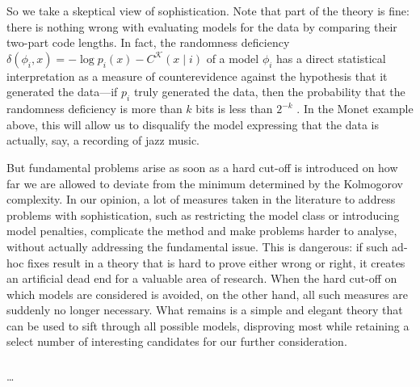 \documentclass{style/llncs}
\newcommand{\K}{\mathscr K}
\newcommand{\hide}[1]{}
\begin{document}
So we take a skeptical view of sophistication. Note that part of the theory is fine: there is nothing wrong with evaluating models for the data by comparing their two-part code lengths. In fact, the randomness deficiency $\delta(\phi_i,x)=-\log p_i(x)-C^\K(x\mid i)$ of a model $\phi_i$ has a direct statistical interpretation as a measure of counterevidence against the hypothesis that it generated the data---if $p_i$ truly generated the data, then the probability that the randomness deficiency is more than $k$ bits is less than $2^{-k}$ \cite[Lemma~6]{bloem2014safe}. In the Monet example above, this will allow us to disqualify the model expressing that the data is actually, say, a recording of jazz music.

But fundamental problems arise as soon as a hard cut-off is introduced on how far we are allowed to deviate from the minimum determined by the Kolmogorov complexity. In our opinion, a lot of measures taken in the literature to address problems with sophistication, such as restricting the model class or introducing model penalties, complicate the method and make problems harder to analyse, without actually addressing the fundamental issue. This is dangerous: if such ad-hoc fixes result in a theory that is hard to prove either wrong or right, it creates an artificial dead end for a valuable area of research. When the hard cut-off on which models are considered is avoided, on the other hand, all such measures are suddenly no longer necessary. What remains is a simple and elegant theory that can be used to sift through all possible models, disproving most while retaining a select number of interesting candidates for our further consideration.

\subsubsection*{\ackname}
\ldots
\hide{This publication was supported by the Dutch national program COMMIT and by  the Netherlands eScience center. We thank Tom Sterkenburg for interesting discussions.}




\appendix
\end{document}
